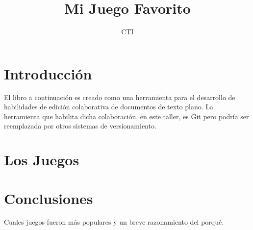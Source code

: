 \documentclass[12pt,oneside]{book}
\title{Mi Juego Favorito}
\author{CTI}
\begin{document}
\maketitle
\tableofcontents

\chapter{Introducción}
El libro a continuación es creado como una herramienta para el desarrollo de habilidades de edición colaborativa de documentos de texto plano. La herramienta que habilita dicha colaboración, en este taller, es Git pero podría ser reemplazada por otros sistemas de versionamiento.

\chapter{Los Juegos}

%
%
%


\chapter{Conclusiones}
Cuales juegos fueron más populares y un breve razonamiento del porqué.
\end{document}

